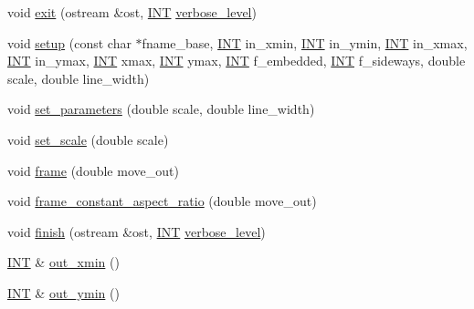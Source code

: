 \begin{DoxyCompactItemize}
\item 
void \mbox{\hyperlink{classmp__graphics_a7edc9d2511b80f80e0711b6723ef9682}{exit}} (ostream \&ost, \mbox{\hyperlink{galois_8h_a09fddde158a3a20bd2dcadb609de11dc}{I\+NT}} \mbox{\hyperlink{simeon_8_c_a818073fbcc2f439e7c56952f67386122}{verbose\+\_\+level}})
\item 
void \mbox{\hyperlink{classmp__graphics_a5b81adfb712dfb64b123db4ae72fadf2}{setup}} (const char $\ast$fname\+\_\+base, \mbox{\hyperlink{galois_8h_a09fddde158a3a20bd2dcadb609de11dc}{I\+NT}} in\+\_\+xmin, \mbox{\hyperlink{galois_8h_a09fddde158a3a20bd2dcadb609de11dc}{I\+NT}} in\+\_\+ymin, \mbox{\hyperlink{galois_8h_a09fddde158a3a20bd2dcadb609de11dc}{I\+NT}} in\+\_\+xmax, \mbox{\hyperlink{galois_8h_a09fddde158a3a20bd2dcadb609de11dc}{I\+NT}} in\+\_\+ymax, \mbox{\hyperlink{galois_8h_a09fddde158a3a20bd2dcadb609de11dc}{I\+NT}} xmax, \mbox{\hyperlink{galois_8h_a09fddde158a3a20bd2dcadb609de11dc}{I\+NT}} ymax, \mbox{\hyperlink{galois_8h_a09fddde158a3a20bd2dcadb609de11dc}{I\+NT}} f\+\_\+embedded, \mbox{\hyperlink{galois_8h_a09fddde158a3a20bd2dcadb609de11dc}{I\+NT}} f\+\_\+sideways, double scale, double line\+\_\+width)
\item 
void \mbox{\hyperlink{classmp__graphics_a809f6dd08b804bf41afbc7855975d212}{set\+\_\+parameters}} (double scale, double line\+\_\+width)
\item 
void \mbox{\hyperlink{classmp__graphics_a432c2c061c21c23230a57511e5f8dac4}{set\+\_\+scale}} (double scale)
\item 
void \mbox{\hyperlink{classmp__graphics_a4094becb93ac234f2f3ebd1be83d10ff}{frame}} (double move\+\_\+out)
\item 
void \mbox{\hyperlink{classmp__graphics_a3b0cc53ceceec91be6ca0dde66f7ca88}{frame\+\_\+constant\+\_\+aspect\+\_\+ratio}} (double move\+\_\+out)
\item 
void \mbox{\hyperlink{classmp__graphics_af143e19052d1e5f8c00753c44860dea1}{finish}} (ostream \&ost, \mbox{\hyperlink{galois_8h_a09fddde158a3a20bd2dcadb609de11dc}{I\+NT}} \mbox{\hyperlink{simeon_8_c_a818073fbcc2f439e7c56952f67386122}{verbose\+\_\+level}})
\item 
\mbox{\hyperlink{galois_8h_a09fddde158a3a20bd2dcadb609de11dc}{I\+NT}} \& \mbox{\hyperlink{classmp__graphics_a565bfb3987a4e246e3fd61d15c714ee7}{out\+\_\+xmin}} ()
\item 
\mbox{\hyperlink{galois_8h_a09fddde158a3a20bd2dcadb609de11dc}{I\+NT}} \& \mbox{\hyperlink{classmp__graphics_a01d97c3ec8360a3c2244aa895e2b9c9e}{out\+\_\+ymin}} ()
\item 

\end{DoxyCompactItemize}
